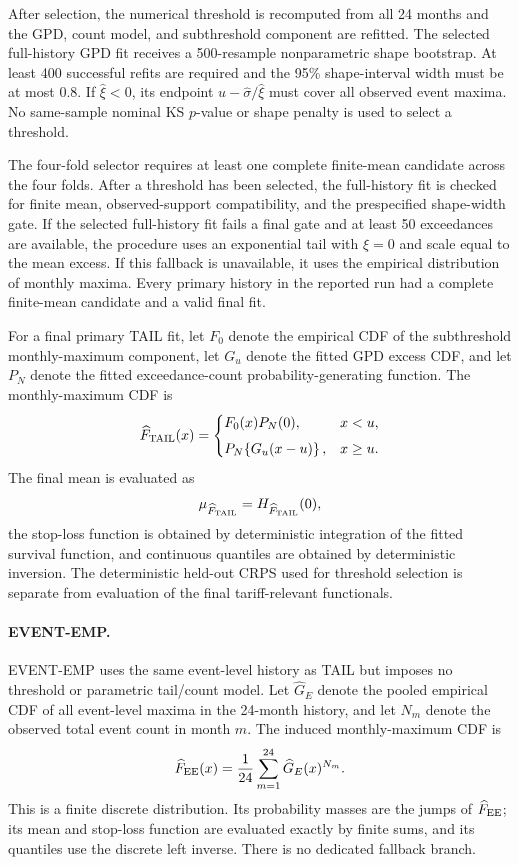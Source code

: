 \documentclass[]{interact}
\begin{document}
After selection, the numerical threshold is recomputed from all 24
months and the GPD, count model, and subthreshold component are refitted.
The selected full-history GPD fit receives a 500-resample nonparametric
shape bootstrap. At least 400 successful refits are required and the
95\% shape-interval width must be at most 0.8. If $\widehat\xi<0$,
its endpoint $u-\widehat\sigma/\widehat\xi$ must cover all observed
event maxima. No same-sample nominal KS $p$-value or shape penalty is
used to select a threshold.

The four-fold selector requires at least one complete finite-mean
candidate across the four folds. After a threshold has been selected,
the full-history fit is checked for finite mean, observed-support
compatibility, and the prespecified shape-width gate. If the selected
full-history fit fails a final gate and at least 50 exceedances are
available, the procedure uses an exponential tail with $\xi=0$ and
scale equal to the mean excess. If this fallback is unavailable, it
uses the empirical distribution of monthly maxima. Every primary
history in the reported run had a complete
finite-mean candidate and a valid final fit.

For a final primary TAIL fit, let \(F_0\) denote the empirical CDF of
the subthreshold monthly-maximum component, let \(G_u\) denote the
fitted GPD excess CDF, and let \(P_N\) denote the fitted exceedance-count
probability-generating function. The monthly-maximum CDF is
\[
\widehat F_{\rm TAIL}(x)
=
\begin{cases}
F_0(x)P_N(0),
&
x<u,
\\[4pt]
P_N\!\left\{G_u(x-u)\right\},
&
x\geq u.
\end{cases}
\]
The final mean is evaluated as
\[
\mu_{\widehat F_{\rm TAIL}}
=
H_{\widehat F_{\rm TAIL}}(0),
\]
the stop-loss function is obtained by deterministic integration of the
fitted survival function, and continuous quantiles are obtained by
deterministic inversion. The deterministic held-out CRPS used for threshold selection is
separate from evaluation of the final tariff-relevant functionals.



\paragraph*{EVENT-EMP.}

EVENT-EMP uses the same event-level history as TAIL but imposes no
threshold or parametric tail/count model. Let \(\widehat G_E\) denote
the pooled empirical CDF of all event-level maxima in the 24-month
history, and let \(N_m\) denote the observed total event count in
month \(m\). The induced monthly-maximum CDF is
\[
\widehat F_{\rm EE}(x)
=
\frac{1}{24}
\sum_{m=1}^{24}
\widehat G_E(x)^{N_m}.
\]
This is a finite discrete distribution. Its probability masses are the
jumps of \(\widehat F_{\rm EE}\); its mean and stop-loss function are
evaluated exactly by finite sums, and its quantiles use the discrete
left inverse. There is no dedicated fallback branch.
\end{document}
